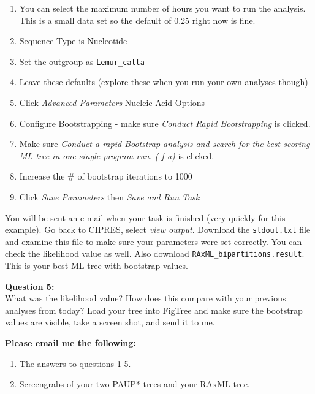 \documentclass[11pt]{article}
\begin{document}
\begin{enumerate}
\item  You can select the maximum number of hours you want to run the analysis. This is a small data set so the default of 0.25 right now is fine.
\item  Sequence Type is Nucleotide
\item  Set the outgroup as \texttt{Lemur\_catta}
\item  Leave these defaults (explore these when you run your own analyses though)
\item  Click \textit{Advanced Parameters} Nucleic Acid Options
\item  Configure Bootstrapping - make sure \textit{Conduct Rapid Bootstrapping} is clicked.
\item  Make sure \textit{Conduct a rapid Bootstrap analysis and search for the best-scoring ML tree in one single program run. (-f a)} is clicked.
\item Increase the \# of bootstrap iterations to 1000
\item Click \textit{Save Parameters} then \textit{Save and Run Task}
\end{enumerate}

You will be sent an e-mail when your task is finished (very quickly for this example).  Go back to CIPRES, select \textit{view output}.  
Download the \texttt{stdout.txt} file and examine this file to make sure your parameters were set correctly.  
You can check the likelihood value as well.  
Also download \texttt{RAxML\_bipartitions.result}.  
This is your best ML tree with bootstrap values.

\begin{framed}
\noindent
\textbf{Question 5:} \\
What was the likelihood value?  How does this compare with your previous analyses from today?  Load your tree into FigTree and make sure the bootstrap values are visible, take a screen shot, and send it to me. 
\end{framed}

\begin{framed}
\noindent
\textbf{Please email me the following:}
\begin{enumerate}
  \item The answers to questions 1-5.
  \item Screengrabs of your two PAUP* trees and your RAxML tree.
\end{enumerate}
\end{framed}


 
\end{document}
